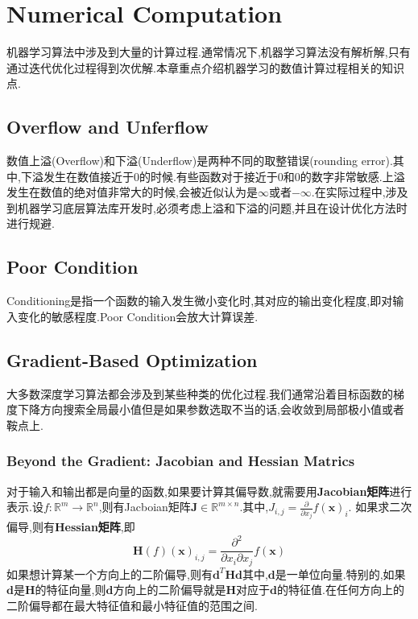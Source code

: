\chapter{Numerical Computation}

机器学习算法中涉及到大量的计算过程.通常情况下,机器学习算法没有解析解,只有通过迭代优化过程得到次优解.本章重点介绍机器学习的数值计算过程相关的知识点.

\section{Overflow and Unferflow}
数值上溢(Overflow)和下溢(Underflow)是两种不同的取整错误(rounding error).其中,下溢发生在数值接近于$0$的时候.有些函数对于接近于$0$和$0$的数字非常敏感.上溢发生在数值的绝对值非常大的时候,会被近似认为是$\infty$或者$-\infty$.在实际过程中,涉及到机器学习底层算法库开发时,必须考虑上溢和下溢的问题,并且在设计优化方法时进行规避.

\section{Poor Condition}
Conditioning是指一个函数的输入发生微小变化时,其对应的输出变化程度,即对输入变化的敏感程度.Poor Condition会放大计算误差.

\section{Gradient-Based Optimization}
大多数深度学习算法都会涉及到某些种类的优化过程.我们通常沿着目标函数的梯度下降方向搜索全局最小值但是如果参数选取不当的话,会收敛到局部极小值或者鞍点上.

\subsection{Beyond the Gradient: Jacobian and Hessian Matrics}
对于输入和输出都是向量的函数,如果要计算其偏导数,就需要用\textbf{Jacobian矩阵}进行表示.设$f:\mathbb R^m\rightarrow\mathbb R^n$,则有Jacboian矩阵$\mathbf J\in\mathbb R^{m\times n}$.其中,$J_{i,j}=\frac{\partial}{\partial x_j}f(\mathbf x)_i$.
如果求二次偏导,则有\textbf{Hessian矩阵},即
\begin{equation}
\mathbf H(f)(\mathbf x)_{i,j}=\frac{\partial^2}{\partial x_i\partial x_j}f(\mathbf x)
\end{equation}
如果想计算某一个方向上的二阶偏导,则有$\mathbf{d}^T\mathbf{Hd}$其中,$\mathbf d$是一单位向量.特别的,如果$\mathbf d$是$\mathbf H$的特征向量,则$\mathbf d$方向上的二阶偏导就是$\mathbf H$对应于$\mathbf d$的特征值.在任何方向上的二阶偏导都在最大特征值和最小特征值的范围之间.

